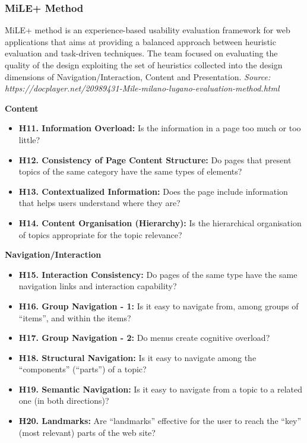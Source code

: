 \subsubsection{MiLE+ Method}
MiLE+ method is an experience-based usability evaluation framework for web applications that aims at providing a balanced approach between heuristic evaluation and task-driven techniques. The team focused on evaluating the quality of the design exploiting the set of heuristics collected into the design dimensions of Navigation/Interaction, Content and Presentation.
\textit{Source: https://docplayer.net/20989431-Mile-milano-lugano-evaluation-method.html}

\textbf{Content}
\begin{itemize}
    \item \textbf{H11. Information Overload:} Is the information in a page too much or too little?
    \item \textbf{H12. Consistency of Page Content Structure:} Do pages that present topics of the same category have the same types of elements?
    \item \textbf{H13. Contextualized Information:} Does the page include information that helps users understand where they are?
    \item \textbf{H14. Content Organisation (Hierarchy):} Is the hierarchical organisation of topics appropriate for the topic relevance?
\end{itemize}

\textbf{Navigation/Interaction}
\begin{itemize}
    \item \textbf{H15.  Interaction Consistency:} Do pages of the same type have the same navigation links and interaction capability?
    \item \textbf{H16.  Group Navigation - 1:} Is it easy to navigate from, among groups of “items”, and within the items?
    \item \textbf{H17.  Group Navigation - 2:} Do menus create cognitive overload?
    \item \textbf{H18.  Structural Navigation:} Is it easy to navigate among the “components” (“parts”) of a topic?
    \item \textbf{H19.  Semantic Navigation:} Is it easy to navigate from a topic to a related one (in both directions)?
    \item \textbf{H20.  Landmarks:} Are “landmarks” effective for the user to reach the “key” (most relevant) parts of the web site?
\end{itemize}

